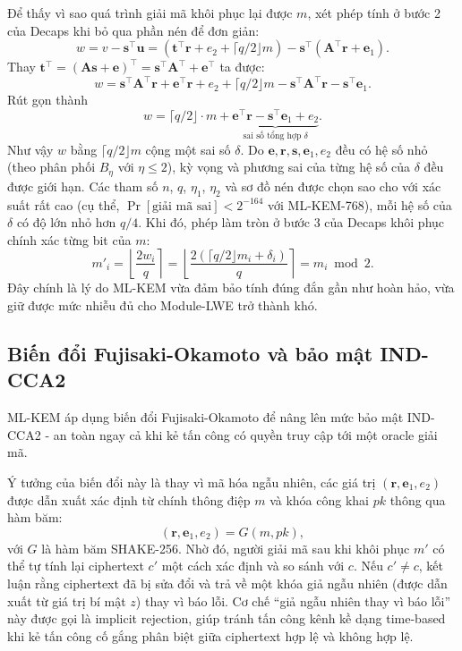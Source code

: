 Để thấy vì sao quá trình giải mã khôi phục lại được $m$, xét phép tính ở bước 2 của Decaps khi bỏ qua phần nén để đơn giản:
\[
w = v - \mathbf{s}^{\top} \mathbf{u}
  = \left( \mathbf{t}^{\top} \mathbf{r} + e_2 + \lceil q/2 \rfloor m \right) - \mathbf{s}^{\top} \left( \mathbf{A}^{\top} \mathbf{r} + \mathbf{e}_1 \right).
\]
Thay $\mathbf{t}^{\top} = (\mathbf{A} \mathbf{s} + \mathbf{e})^{\top} = \mathbf{s}^{\top} \mathbf{A}^{\top} + \mathbf{e}^{\top}$ ta được:
\[
w = \mathbf{s}^{\top} \mathbf{A}^{\top} \mathbf{r} + \mathbf{e}^{\top} \mathbf{r} + e_2 + \lceil q/2 \rfloor m - \mathbf{s}^{\top} \mathbf{A}^{\top} \mathbf{r} - \mathbf{s}^{\top} \mathbf{e}_1.
\]
Rút gọn thành
\[
w = \lceil q/2 \rfloor \cdot m + \underbrace{\mathbf{e}^{\top} \mathbf{r} - \mathbf{s}^{\top} \mathbf{e}_1 + e_2}_{\text{sai số tổng hợp } \delta}.
\]
Như vậy $w$ bằng $\lceil q/2 \rfloor m$ cộng một sai số $\delta$. Do $\mathbf{e}, \mathbf{r}, \mathbf{s}, \mathbf{e}_1, e_2$ đều có hệ số nhỏ (theo phân phối $B_\eta$ với $\eta \leq 2$), kỳ vọng và phương sai của từng hệ số của $\delta$ đều được giới hạn. Các tham số $n$, $q$, $\eta_1$, $\eta_2$ và sơ đồ nén được chọn sao cho với xác suất rất cao (cụ thể, $\Pr[\text{giải mã sai}] < 2^{-164}$ với ML-KEM-768), mỗi hệ số của $\delta$ có độ lớn nhỏ hơn $q/4$. Khi đó, phép làm tròn ở bước 3 của Decaps khôi phục chính xác từng bit của $m$:
\[
m'_i = \left\lfloor \frac{2 w_i}{q} \right\rceil = \left\lfloor \frac{2 (\lceil q/2 \rfloor m_i + \delta_i)}{q} \right\rceil = m_i \bmod 2.
\]
Đây chính là lý do ML-KEM vừa đảm bảo tính đúng đắn gần như hoàn hảo, vừa giữ được mức nhiễu đủ cho Module-LWE trở thành khó.

\subsection{Biến đổi Fujisaki-Okamoto và bảo mật IND-CCA2}

ML-KEM áp dụng biến đổi Fujisaki-Okamoto để nâng lên mức bảo mật IND-CCA2 - an toàn ngay cả khi kẻ tấn công có quyền truy cập tới một oracle giải mã.

Ý tưởng của biến đổi này là thay vì mã hóa ngẫu nhiên, các giá trị $(\mathbf{r}, \mathbf{e}_1, e_2)$ được dẫn xuất xác định từ chính thông điệp $m$ và khóa công khai $pk$ thông qua hàm băm:
\[
(\mathbf{r}, \mathbf{e}_1, e_2) = G(m, pk),
\]
với $G$ là hàm băm SHAKE-256. Nhờ đó, người giải mã sau khi khôi phục $m'$ có thể tự tính lại ciphertext $c'$ một cách xác định và so sánh với $c$. Nếu $c' \neq c$, kết luận rằng ciphertext đã bị sửa đổi và trả về một khóa giả ngẫu nhiên (được dẫn xuất từ giá trị bí mật $z$) thay vì báo lỗi. Cơ chế ``giả ngẫu nhiên thay vì báo lỗi'' này được gọi là implicit rejection, giúp tránh tấn công kênh kề dạng time-based khi kẻ tấn công cố gắng phân biệt giữa ciphertext hợp lệ và không hợp lệ.

